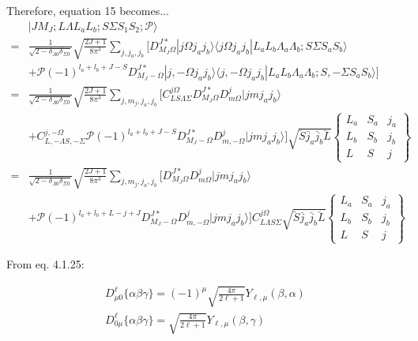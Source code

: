 \documentclass[prl, longbibliography]{revtex4-2}
\begin{document}
Therefore, equation 15 becomes...
\begin{equation}
\begin{split}
&|J M_J; L \Lambda L_a L_b; S \Sigma  S_1 S_2; \mathcal{P} \rangle
\\
=&\frac{1}{\sqrt{2-\delta_{\Lambda 0}\delta_{\Sigma 0}}}
\sqrt{\frac{2J+1}{8\pi^3}}
\sum_{j, j_a, j_b} 
\bigg[D^{J*}_{M_J\Omega}
|j\Omega j_a j_b\rangle\langle j\Omega j_a j_b | L_a L_b \Lambda_a \Lambda_b; S\Sigma S_a S_b\rangle
\\
&+\mathcal{P}(-1)^{l_a+l_b+J-S}D^{J*}_{M_J-\Omega}
|j,-\Omega j_a j_b\rangle\langle j,-\Omega j_a j_b | L_a L_b \Lambda_a \Lambda_b; S,-\Sigma S_a S_b\rangle
\bigg]
\\
=&\frac{1}{\sqrt{2-\delta_{\Lambda 0}\delta_{\Sigma 0}}}
\sqrt{\frac{2J+1}{8\pi^3}}
\sum_{j, m_j, j_a, j_b} \bigg[
C_{L S \Lambda \Sigma}^{j \Omega}
D^{J*}_{M_J\Omega}D^j_{m \Omega}
|j m j_a j_b\rangle
\\
&+
C_{L,-\Lambda S,-\Sigma}^{j,-\Omega}
\mathcal{P}(-1)^{l_a+l_b+J-S}D^{J*}_{M_J-\Omega}
D^j_{m,-\Omega}|j m j_a j_b\rangle \bigg]
\sqrt{\breve{S}\breve{j_a}\breve{j_b}\breve{L}}
\begin{Bmatrix}
L_a & S_a & j_a\\
L_b & S_b & j_b\\
L & S & j
\end{Bmatrix}
\\
=&\frac{1}{\sqrt{2-\delta_{\Lambda 0}\delta_{\Sigma 0}}}
\sqrt{\frac{2J+1}{8\pi^3}}
\sum_{j, m_j, j_a, j_b} \bigg[
D^{J*}_{M_J\Omega}D^j_{m \Omega}
|j m j_a j_b\rangle
\\
&+
\mathcal{P}(-1)^{l_a+l_b+L-j+J}D^{J*}_{M_J-\Omega}
D^j_{m,-\Omega}|j m j_a j_b\rangle \bigg]
C_{L\Lambda S\Sigma}^{j\Omega}\sqrt{\breve{S}\breve{j_a}\breve{j_b}\breve{L}}
\begin{Bmatrix}
L_a & S_a & j_a\\
L_b & S_b & j_b\\
L & S & j
\end{Bmatrix}
\end{split}
\end{equation}

From \cite{edmonds_angular_1960}  eq. 4.1.25:

\begin{equation}
\begin{split}
D^{\ell}_{\mu 0}\{\alpha\beta\gamma\} = (-1)^\mu \sqrt{\frac{4\pi}{2\ell+1}}Y_{\ell,\mu}(\beta,\alpha)\\
D^{\ell}_{0\mu}\{\alpha\beta\gamma\} = \sqrt{\frac{4\pi}{2\ell+1}}Y_{\ell,\mu}(\beta,\gamma)
\end{split}
\end{equation}
\end{document}
